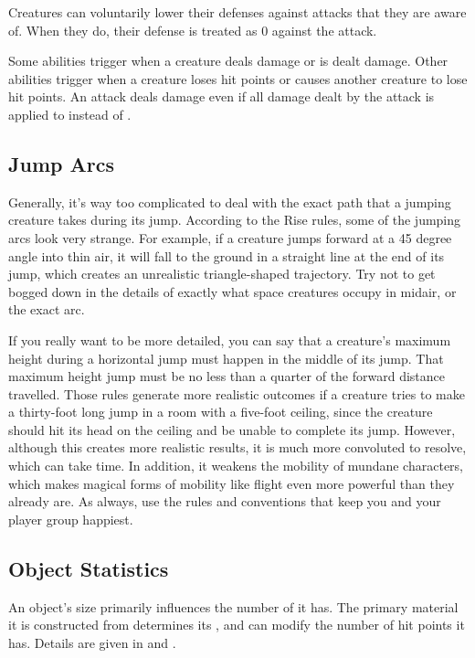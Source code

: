     Creatures can voluntarily lower their defenses against attacks that they are aware of.
    When they do, their defense is treated as 0 against the attack.

    Some abilities trigger when a creature deals damage or is dealt damage.
    Other abilities trigger when a creature loses hit points or causes another creature to lose hit points.
    An attack deals damage even if all damage dealt by the attack is applied to  instead of .

    \subsection{Jump Arcs}
        Generally, it's way too complicated to deal with the exact path that a jumping creature takes during its jump.
        According to the Rise rules, some of the jumping arcs look very strange.
        For example, if a creature jumps forward at a 45 degree angle into thin air, it will fall to the ground in a straight line at the end of its jump, which creates an unrealistic triangle-shaped trajectory.
        Try not to get bogged down in the details of exactly what space creatures occupy in midair, or the exact arc.

        If you really want to be more detailed, you can say that a creature's maximum height during a horizontal jump must happen in the middle of its jump.
        That maximum height jump must be no less than a quarter of the forward distance travelled.
        Those rules generate more realistic outcomes if a creature tries to make a thirty-foot long jump in a room with a five-foot ceiling, since the creature should hit its head on the ceiling and be unable to complete its jump.
        However, although this creates more realistic results, it is much more convoluted to resolve, which can take time.
        In addition, it weakens the mobility of mundane characters, which makes magical forms of mobility like flight even more powerful than they already are.
        As always, use the rules and conventions that keep you and your player group happiest.

    \subsection{Object Statistics}
        An object's size primarily influences the number of  it has.
        The primary material it is constructed from determines its , and can modify the number of hit points it has.
        Details are given in  and .

